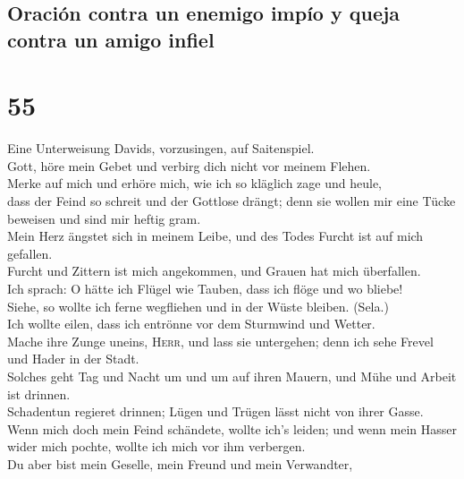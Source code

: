 \hypertarget{oraciuxf3n-contra-un-enemigo-impuxedo-y-queja-contra-un-amigo-infiel}{%
\subsection{Oración contra un enemigo impío y queja contra un amigo
infiel}\label{oraciuxf3n-contra-un-enemigo-impuxedo-y-queja-contra-un-amigo-infiel}}

\hypertarget{section-54}{%
\section{55}\label{section-54}}

 Eine Unterweisung Davids, vorzusingen, auf Saitenspiel.\\
 Gott, höre mein Gebet und verbirg dich nicht vor meinem
Flehen.\\
 Merke auf mich und erhöre mich, wie ich so kläglich zage
und heule,\\
 dass der Feind so schreit und der Gottlose drängt; denn
sie wollen mir eine Tücke beweisen und sind mir heftig gram.\\
 Mein Herz ängstet sich in meinem Leibe, und des Todes
Furcht ist auf mich gefallen.\\
 Furcht und Zittern ist mich angekommen, und Grauen hat
mich überfallen.\\
 Ich sprach: O hätte ich Flügel wie Tauben, dass ich flöge
und wo bliebe!\\
 Siehe, so wollte ich ferne wegfliehen und in der Wüste
bleiben. (Sela.)\\
 Ich wollte eilen, dass ich entrönne vor dem Sturmwind und
Wetter.\\
 Mache ihre Zunge uneins, \textsc{Herr}, und lass sie
untergehen; denn ich sehe Frevel und Hader in der Stadt.\\
 Solches geht Tag und Nacht um und um auf ihren Mauern,
und Mühe und Arbeit ist drinnen.\\
 Schadentun regieret drinnen; Lügen und Trügen lässt
nicht von ihrer Gasse.\\
 Wenn mich doch mein Feind schändete, wollte ich's
leiden; und wenn mein Hasser wider mich pochte, wollte ich mich vor ihm
verbergen.\\
 Du aber bist mein Geselle, mein Freund und mein
Verwandter,\\
